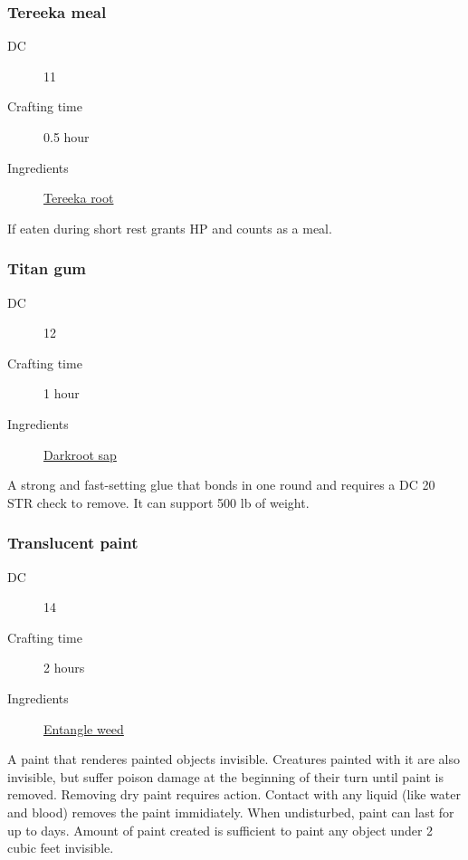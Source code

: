 \subsubsection{Tereeka meal}
\label{Tereeka meal}

\begin{description}
\item [DC] 11 \survival
\item [Crafting time] 0.5 hour
\item [Ingredients] \hyperref[Tereeka Root]{Tereeka root}
\end{description}

If eaten during short rest grants  HP and counts as a meal.

\subsubsection{Titan gum}
\label{Titan gum}

\begin{description}
\item [DC] 12 \nature
\item [Crafting time] 1 hour
\item [Ingredients] \hyperref[Darkroot]{Darkroot sap}
\end{description}

A strong and fast-setting glue that bonds in one round and 
requires a DC 20 STR check to remove. It can support 500 lb of weight.

\subsubsection{Translucent paint}
\label{Translucent paint}

\begin{description}
\item [DC] 14 \arcana
\item [Crafting time] 2 hours
\item [Ingredients] \hyperref[Entangle Weed]{Entangle weed}
\end{description}

A paint that renderes painted objects invisible. Creatures painted with it are also invisible, 
but suffer  poison damage at the beginning of their turn until paint is removed. Removing dry paint requires action. 
Contact with any liquid (like water and blood) removes the paint immidiately. 
When undisturbed, paint can last for up to  days. 
Amount of paint created is sufficient to paint any object under 2 cubic feet invisible.

